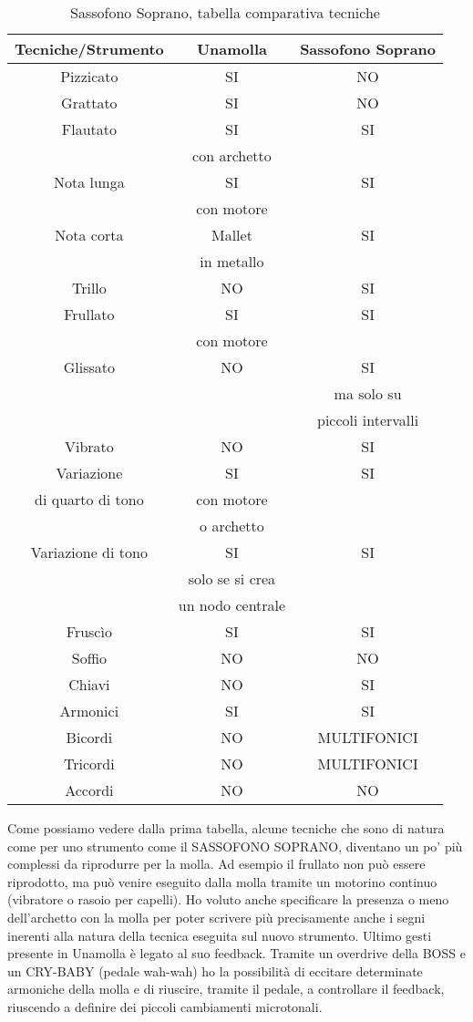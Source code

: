 \begin{table}[htp]
\caption{Sassofono Soprano, tabella comparativa tecniche}
\begin{center}
\begin{tabular}{ccc}
\hline
\textbf{Tecniche/Strumento} & \textbf{Unamolla} & \textbf{Sassofono Soprano} \\
\hline
Pizzicato & SI & NO \\
\hline
Grattato & SI & NO \\
\hline
Flautato & SI & SI \\
		&con archetto & \\
\hline
Nota lunga & SI & SI \\
		&con motore & \\
\hline
Nota corta & Mallet & SI \\
		&in metallo & \\
\hline
Trillo & NO & SI \\
\hline
Frullato & SI & SI \\
		&con motore & \\
\hline
Glissato & NO & SI \\
		& & ma solo su \\
				& & piccoli intervalli \\
\hline
Vibrato & NO & SI \\
\hline
Variazione & SI & SI \\
di quarto di tono & con motore & \\
& o archetto & \\
\hline
Variazione di tono & SI & SI \\
& solo se si crea & \\
& un nodo centrale & \\
\hline
Fruscìo & SI & SI \\
\hline
Soffio & NO & NO \\
\hline
Chiavi & NO & SI \\
\hline
Armonici & SI & SI \\
\hline
Bicordi & NO & MULTIFONICI \\
\hline
Tricordi & NO & MULTIFONICI \\
\hline
Accordi & NO &NO \\
\hline
\end{tabular}
\end{center}
\label{default}
\end{table}%

Come possiamo vedere dalla prima tabella, alcune tecniche che sono di natura come
per uno strumento come il SASSOFONO SOPRANO, diventano un po’ più complessi da
riprodurre per la molla. Ad esempio il frullato non può essere riprodotto, ma
può venire eseguito dalla molla tramite un motorino continuo (vibratore o rasoio
per capelli). Ho voluto anche specificare la presenza o meno dell’archetto con
la molla per poter scrivere più precisamente anche i segni inerenti alla natura
della tecnica eseguita sul nuovo strumento. Ultimo gesti presente in Unamolla è
legato al suo feedback. Tramite un overdrive della BOSS e un CRY-BABY (pedale wah-wah)
ho la possibilità di eccitare determinate armoniche della molla e di riuscire,
tramite il pedale, a controllare il feedback, riuscendo a definire dei piccoli
cambiamenti microtonali.
